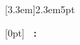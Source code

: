 \contentsmargin{0pt}
\renewcommand\contentspage{\thecontentspage}

[3.3em]{}{2.3em}{5pt}

  [0pt]%
  {\addvspace{1em}}%
  {\bfseries\chaptername\ \thecontentslabel: }%
  {}%
  {\bfseries\dotfill\mdseries\contentspage}%

\tableofcontents